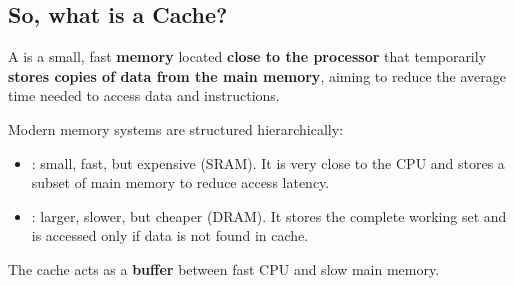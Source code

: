 \subsection{So, what is a Cache?}

\begin{definitionbox}[: Cache]
    A  is a small, fast \textbf{memory} located \textbf{close to the processor} that temporarily \textbf{stores copies of data from the main memory}, aiming to reduce the average time needed to access data and instructions.
\end{definitionbox}

\noindent
Modern memory systems are structured hierarchically:
\begin{itemize}
    \item {}: small, fast, but expensive (SRAM). It is very close to the CPU and stores a subset of main memory to reduce access latency.
    
    \item {}: larger, slower, but cheaper (DRAM). It stores the complete working set and is accessed only if data is not found in cache.
\end{itemize}
The cache acts as a \textbf{buffer} between fast CPU and slow main memory.

